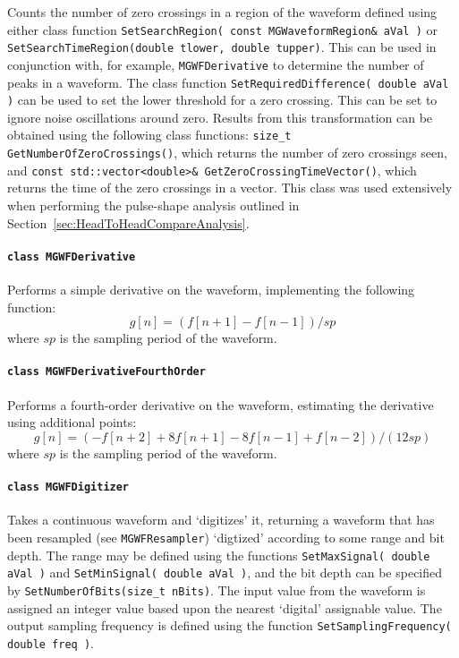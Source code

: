 Counts the number of zero crossings in a region of the waveform defined using either class function \lstinline!SetSearchRegion( const MGWaveformRegion& aVal )! or \lstinline!SetSearchTimeRegion(double tlower, double tupper)!.  This can be used in conjunction with, for example, \lstinline!MGWFDerivative! to determine the number of peaks in a waveform.  The class function \lstinline!SetRequiredDifference( double aVal )! can be used to set the lower threshold for a zero crossing.  This can be set to ignore noise oscillations around zero.  Results from this transformation can be obtained using the following class functions: \lstinline!size_t GetNumberOfZeroCrossings()!, which returns the number of zero crossings seen, and \lstinline!const std::vector<double>& GetZeroCrossingTimeVector()!, which returns the time of the zero crossings in a vector.  This class was used extensively when performing the pulse-shape analysis outlined in Section~\ref{sec:HeadToHeadCompareAnalysis}.
			
			\paragraph{\lstinline!class MGWFDerivative!} 

Performs a simple derivative on the waveform, implementing the following function:
				\[
					g[n] = (f[n+1] - f[n-1])/sp
				\]
where $sp$ is the sampling period of the waveform.

			\paragraph{\lstinline!class MGWFDerivativeFourthOrder!} 

Performs a fourth-order derivative on the waveform, estimating the derivative using additional points:
				\[
					g[n] = ( -f[n+2] + 8 f[n+1] - 8 f[n-1] + f[n-2])/(12 sp)
				\]
where $sp$ is the sampling period of the waveform.
				
			\paragraph{\lstinline!class MGWFDigitizer!} 

Takes a continuous waveform and `digitizes' it, returning a waveform that has been resampled (see \lstinline!MGWFResampler!) `digtized' according to some range and bit depth.  The range may be defined using the functions \lstinline!SetMaxSignal( double aVal )! and \lstinline!SetMinSignal( double aVal )!, and the bit depth can be specified by \lstinline!SetNumberOfBits(size_t nBits)!.  The input value from the waveform is assigned an integer value based upon the nearest `digital' assignable value.  The output sampling frequency is defined using the function \lstinline!SetSamplingFrequency( double freq )!.  
			
